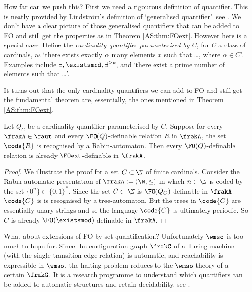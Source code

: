 How far can we push this? First we need a rigourous definition of quantifier.
This is neatly provided by Lindstr\"om's definition of `generalised quantifier',
see \cite{Lind66}. We don't have a clear picture of those generalised quantifiers that can
be added to FO and still get the properties as in Theorem \ref{AS:thm:FOext}.
However here is a special case. Define the
{\em cardinality quantifier parameterised by $C$}, for $C$  a class of
cardinals, as `there exists exactly $\alpha$ many elements $x$ such that \ldots,
where $\alpha \in C$'. Examples include $\exists, \existsmod,\exists^{\geq \kappa}$, and
`there exist a prime number of elements such that \dots'.

It turns out that the only cardinality quantifiers we can add to FO and still get the fundamental theorem are, essentially, 
the ones mentioned in Theorem \ref{AS:thm:FOext}.

\begin{theorem} 
Let $Q_C$ be a cardinality quantifier parameterised by $C$.  Suppose for every
$\frakA \in \raut$ and every $\FO(Q)$-definable relation $R$ in $\frakA$,
the set $\code{R}$ is recognised by a Rabin-automaton.  Then every $\FO(Q)$-definable relation 
is already $\FOext$-definable in $\frakA$. 
\end{theorem}


\begin{proof} 
We illustrate the proof for a set $C \subset \N$ of finite cardinals.
Consider the Rabin-automatic presentation of  $\frakA := (\N,\leq)$ in which $n \in \N$ is coded
by the set $\{0^n\} \subset \{0,1\}^\ast$. Since the set $C \subset \N$  is $\FO(Q_C)$-definable in $\frakA$, $\code{C}$ is
is recognised by a tree-automaton. But the trees in $\code{C}$ are essentially unary strings and so the language $\code{C}$ is ultimately periodic. So $C$ is already $\FO(\existsmod)$-definable in $\frakA$. 
\end{proof}

What about extensions of FO by set quantification?  Unfortunately $\wmso$ is
too much to hope for.  Since the configuration graph $\frakG$ of a Turing machine (with the
single-transition edge relation) is automatic, and reachability
is expressible in $\wmso$, the halting problem reduces to the $\wmso$-theory of a certain $\frakG$. It is a research programme to understand
which quantifiers can be added to automatic structures and retain decidability, see \cite{KuLo08,Rubi04}. %


